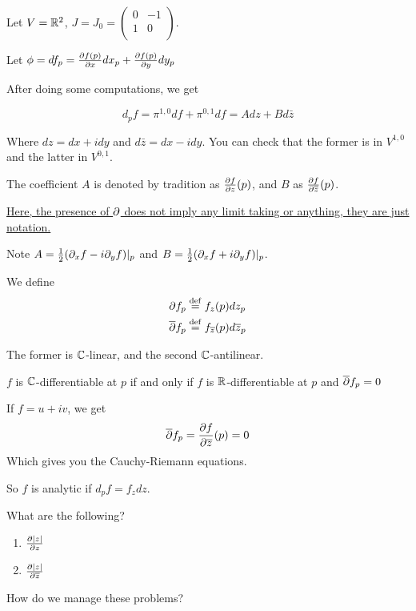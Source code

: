 \documentclass[x11names,reqno,14pt]{extarticle}
\begin{document}
Let $V = \mathbb{R}^2$, $J = J_0 = \begin{pmatrix} 0 & -1 \\ 1 & 0 \\ \end{pmatrix}$. 

Let $\phi = df_p = \frac{\partial f(p)}{\partial x}dx_p + \frac{\partial f(p)}{\partial y}dy_p$

After doing some computations, we get

\[
d_pf = \pi^{1, 0}df + \pi^{0, 1}df = Adz + Bd\bar{z}
\]

Where $dz = dx + idy$ and $d\bar{z} = dx - idy$. You can check that the former is in $V^{1, 0}$ and the latter in $V^{0, 1}$. 

The coefficient $A$ is denoted by tradition as $\frac{\partial f}{\partial z}(p)$, and $B$ as $\frac{\partial f}{\partial \overline{z}}(p)$. 

\underline{Here, the presence of $\partial$ does not imply any limit taking or anything, they are just notation.}

Note $A = \frac{1}{2}(\partial_xf - i\partial_yf)|_p$ and $B = \frac{1}{2}(\partial_xf + i\partial_yf)|_p$.


We define 
\begin{align*}
\partial f_p & \overset{\mathrm{def}}{=} f_z(p)dz_p \\
\overline{\partial}f_p & \overset{\mathrm{def}}{=} f_{\overline{z}}(p)d\overline{z}_p \\
\end{align*}

The former is $\mathbb{C}$-linear, and the second $\mathbb{C}$-antilinear. 

\claim

$f$ is $\mathbb{C}$-differentiable at $p$ if and only if $f$ is $\mathbb{R}$-differentiable at $p$ and $\overline{\partial}f_p = 0$

\proof

If $f = u + iv$, we get
\[
\overline{\partial}f_p = \frac{\partial f}{\partial\overline{z}}(p) =0
\]
Which gives you the Cauchy-Riemann equations. 

So $f$ is analytic if $d_pf = f_zdz$. 

\exm

What are the following? 
\begin{enumerate}
\item $\frac{\partial|z|}{\partial z}$
\item $\frac{\partial|z|}{\partial\overline{z}}$
\end{enumerate}

How do we manage these problems?
\end{document}

